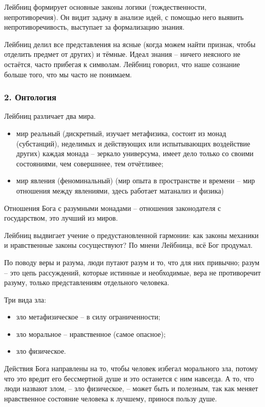 \documentclass[a4paper, 12pt]{book} %
\begin{document}
Лейбниц формирует основные законы логики (тождественности, непротиворечия). Он видит задачу в анализе идей, с помощью него выявить непротиворечивость, выступает за формализацию знания.

Лейбниц делил все представления на ясные (когда можем найти признак, чтобы отделить предмет от других) и тёмные. Идеал знания -- ничего неясного не остаётся, часто прибегая к символам. Лейбниц говорил, что наше сознание больше того, что мы часто не понимаем.

\subsubsection*{2. Онтология}
Лейбниц различает два мира.
\begin{itemize}
\item мир реальный (дискретный, изучает метафизика, состоит из монад (субстанций), неделимых и действующих или испытывающих воздействие других) каждая монада -- зеркало универсума, имеет дело только со своими состояниями, чем совершннее, тем отчётливее; 
\item мир явления (феноминальный) (мир опыта в пространстве и времени -- мир отношения между явлениями, здесь работает матанализ и физика)
\end{itemize}	

Отношения Бога с разумными монадами -- отношения законодателя с государством, это лучший из миров.

Лейбниц выдвигает учение о предустановленной гармонии: как законы механики и нравственные законы сосуществуют? По мнени Лейбница, всё Бог продумал.

По поводу веры и разума, люди путают разум и то, что для них привычно; разум -- это цепь рассуждений, которые истинные и необходимые, вера не противоречит разуму, только представлениям отдельного человека.

Три вида зла:
\begin{itemize}
\item зло метафизическое -- в силу ограниченности;
\item зло моральное -- нравственное (самое опасное);
\item зло физическое.
\end{itemize}
Действия Бога направлены на то, чтобы человек избегал морального зла, потому что это вредит его бессмертной душе и это останется с ним навсегда. А то, что люди назвают злом, -- зло физическое, -- может быть и полезным, так как меняет нравственное состояние человека к лучшему, принося пользу душе.
\end{document}
